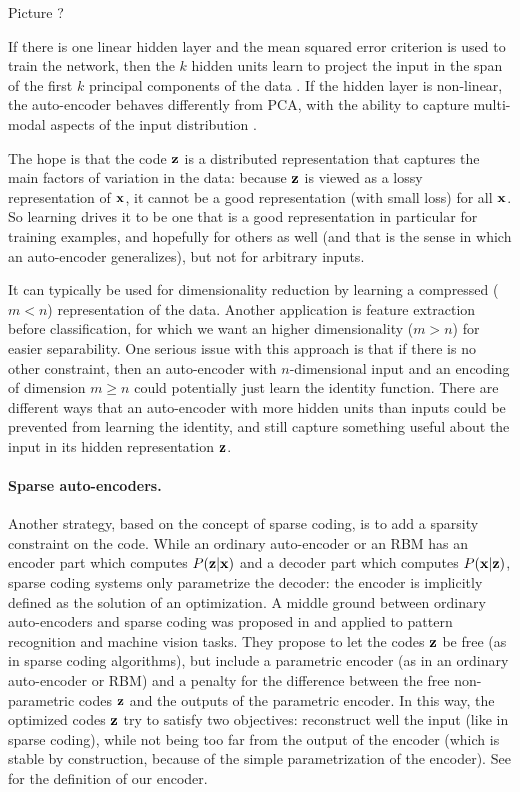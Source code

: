 {\color{red} Picture ?}

If there is one linear hidden layer and the mean squared error criterion is used to train the network, then the $k$ hidden units learn to project the input in the span of the first $k$ principal components of the data \cite{bourlard1988autoencoder}. If the hidden layer is non-linear, the auto-encoder behaves differently from \gls{PCA}, with the ability to capture multi-modal aspects of the input distribution \cite{japkowicz2000autoencoderPCA}.

The hope is that the code $\mathbf{z}$ is a distributed representation that captures the main factors of variation in the data: because $\mathbf{z}$ is viewed as a lossy representation of $\mathbf{x}$, it cannot be a good representation (with small loss) for all $\mathbf{x}$. So learning drives it to be one that is a good representation in particular for training examples, and hopefully for others as well (and that is the sense in which an auto-encoder generalizes), but not for arbitrary inputs.

It can typically be used for dimensionality reduction by learning a compressed ($m<n$) representation of the data. Another application is feature extraction before classification, for which we want an higher dimensionality ($m>n$) for easier separability. One serious issue with this approach is that if there is no other constraint, then an auto-encoder with $n$-dimensional input and an encoding of dimension $m \geq n$ could potentially just learn the identity function. There are different ways that an auto-encoder with more hidden units than inputs could be prevented from learning the identity, and still capture something useful about the input in its hidden representation $\mathbf{z}$.

\paragraph{Sparse auto-encoders.}
Another strategy, based on the concept of sparse coding, is to add a sparsity constraint on the code. While an ordinary auto-encoder or an \gls{RBM} has an encoder part which computes $P(\mathbf{z}|\mathbf{x})$ and a decoder part which computes $P(\mathbf{x}|\mathbf{z})$, sparse coding systems only parametrize the decoder: the encoder is implicitly defined as the solution of an optimization. A middle ground between ordinary auto-encoders and sparse coding was proposed in \cite{lecun2006sparseAutoencoders, ranzato2007stackedSparseAutoencoders} and applied to pattern recognition and machine vision tasks. They propose to let the codes $\mathbf{z}$ be free (as in sparse coding algorithms), but include a parametric encoder (as in an ordinary auto-encoder or \gls{RBM}) and a penalty for the difference between the free non-parametric codes $\mathbf{z}$ and the outputs of the parametric encoder. In this way, the optimized codes $\mathbf{z}$ try to satisfy two objectives: reconstruct well the input (like in sparse coding), while not being too far from the output of the encoder (which is stable by construction, because of the simple parametrization of the encoder). See  for the definition of our encoder.

